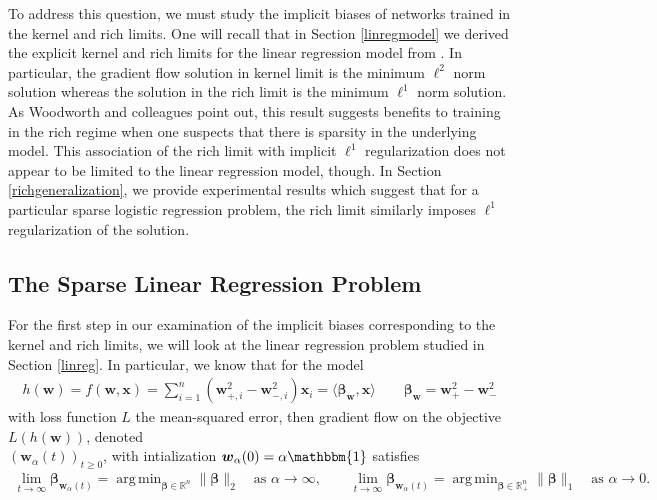 \documentclass{article}
\DeclareMathOperator*{\argmin}{arg\,min}
\begin{document}
To address this question, we must study the implicit biases of networks trained in the kernel and rich limits. One will recall that in Section \ref{linregmodel} we derived the explicit kernel and rich limits for the linear regression model from \cite{woodworth2020kernel}. In particular, the gradient flow solution in kernel limit is the minimum $\ell^2$ norm solution whereas the solution in the rich limit is the minimum $\ell^1$ norm solution. As Woodworth and colleagues point out, this result suggests benefits to training in the rich regime when one suspects that there is sparsity in the underlying model. This association of the rich limit with implicit $\ell^1$ regularization does not appear to be limited to the linear regression model, though. In Section \ref{richgeneralization}, we provide experimental results which suggest that for a particular sparse logistic regression problem, the rich limit similarly imposes $\ell^1$ regularization of the solution.

\subsection{The Sparse Linear Regression Problem}

For the first step in our examination of the implicit biases corresponding to the kernel and rich limits, we will look at the linear regression problem studied in Section \ref{linreg}. In particular, we know that for the model
\begin{align*}
    h(\boldsymbol{w}) = f(\boldsymbol{w}, \boldsymbol{x}) = \sum_{i=1}^n(\boldsymbol{w}_{+, i}^2 - \boldsymbol{w}_{-, i}^2)\boldsymbol{x}_i = \langle \boldsymbol{\beta}_{\boldsymbol{w}}, \boldsymbol{x} \rangle \qquad \boldsymbol{\beta}_{\boldsymbol{w}} = \boldsymbol{w}_+^2 -\boldsymbol{w}_-^2
\end{align*}
with loss function $L$ the mean-squared error, then gradient flow on the objective $L(h(\boldsymbol{w}))$, denoted\\ $(\boldsymbol{w}_{\alpha}(t))_{t \geq 0}$, with intialization $\boldsymbol{w}_{\alpha}(0) = \alpha \mathbbm{1}$ satisfies
\begin{align*}
    \lim_{t \to \infty} \boldsymbol{\beta}_{\boldsymbol{w}_{\alpha}(t)} = \argmin_{\boldsymbol{\beta} \in \mathbb{R}^n}  \| \boldsymbol{\beta} \|_2 \quad \text{as $\alpha \longrightarrow \infty$}, \qquad 
    \lim_{t \to \infty} \boldsymbol{\beta}_{\boldsymbol{w}_{\alpha}(t)} = \argmin_{\boldsymbol{\beta} \in \mathbb{R}_+^n}  \| \boldsymbol{\beta} \|_1 \quad \text{as $\alpha \longrightarrow 0$}.
\end{align*}
\end{document}
